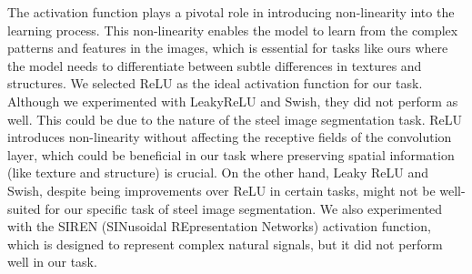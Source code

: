 \documentclass[]{article}
\begin{document}
The activation function plays a pivotal role in introducing non-linearity into the learning process. This non-linearity enables the model to learn from the complex patterns and features in the images, which is essential for tasks like ours where the model needs to differentiate between subtle differences in textures and structures. We selected ReLU as the ideal activation function for our task. Although we experimented with LeakyReLU and Swish, they did not perform as well. This could be due to the nature of the steel image segmentation task. ReLU introduces non-linearity without affecting the receptive fields of the convolution layer, which could be beneficial in our task where preserving spatial information (like texture and structure) is crucial. On the other hand, Leaky ReLU and Swish, despite being improvements over ReLU in certain tasks, might not be well-suited for our specific task of steel image segmentation. We also experimented with the SIREN (SINusoidal REpresentation Networks) activation function, which is designed to represent complex natural signals, but it did not perform well in our task.
\end{document}
